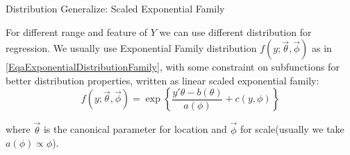 \begin{point}
    Distribution Generalize: Scaled Exponential Family
\end{point}
    For different range and feature of $ Y $ we can use different distribution for regression. We usually use Exponential Family distribution $ f(y;\vec{\theta },\vec{\phi }) $ as in \autoref{EqaExponentialDistributionFamily}, with some constraint on subfunctions for better distribution properties, written as linear scaled exponential family:
\begin{equation}\label{EqaScaledExponentialFamily}
    f(y;\vec{\theta },\vec{\phi})=\exp\left\{ \dfrac{y'\theta -b(\theta )}{a(\phi)}+c(y,\phi ) \right\}
\end{equation}


    where $ \vec{\theta } $ is the canonical parameter for location and $ \vec{\phi } $ for scale(usually we take $ a(\phi )\propto \phi  $).

